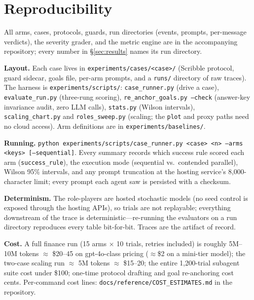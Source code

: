 \documentclass{article}
\begin{document}
\section{Reproducibility}\label{app:repro}
All arms, cases, protocols, guards, run directories (events, prompts, per-message verdicts), the severity grader, and the metric engine are in the accompanying repository; every number in \S\ref{sec:results} names its run directory.

\textbf{Layout.} Each case lives in \texttt{experiments/cases/<case>/} (Scribble protocol, guard sidecar, goals file, per-arm prompts, and a \texttt{runs/} directory of raw traces). The harness is \texttt{experiments/scripts/}: \texttt{case\_runner.py} (drive a case), \texttt{evaluate\_run.py} (three-rung scoring), \texttt{re\_anchor\_goals.py --check} (answer-key invariance audit, zero LLM calls), \texttt{stats.py} (Wilson intervals), \texttt{scaling\_chart.py} and \texttt{roles\_sweep.py} (scaling; the \texttt{plot} and proxy paths need no cloud access). Arm definitions are in \texttt{experiments/baselines/}.

\textbf{Running.} \texttt{python experiments/scripts/case\_runner.py <case> <n> --arms <keys> [--sequential]}. Every summary records which success rule scored each arm (\texttt{success\_rule}), the execution mode (sequential vs.\ contended parallel), Wilson 95\% intervals, and any prompt truncation at the hosting service's 8{,}000-character limit; every prompt each agent saw is persisted with a checksum.

\textbf{Determinism.} The role-players are hosted stochastic models (no seed control is exposed through the hosting APIs), so trials are not replayable; everything downstream of the trace is deterministic---re-running the evaluators on a run directory reproduces every table bit-for-bit. Traces are the artifact of record.

\textbf{Cost.} A full finance run (15 arms $\times$ 10 trials, retries included) is roughly 5M--10M tokens $\approx$ \$20--45 on gpt-4o-class pricing ($\approx$\$2 on a mini-tier model); the two-case scaling run $\approx$ 5M tokens $\approx$ \$15--20; the entire 1{,}200-trial subagent suite cost under \$100; one-time protocol drafting and goal re-anchoring cost cents. Per-command cost lines: \texttt{docs/reference/COST\_ESTIMATES.md} in the repository.
\end{document}

